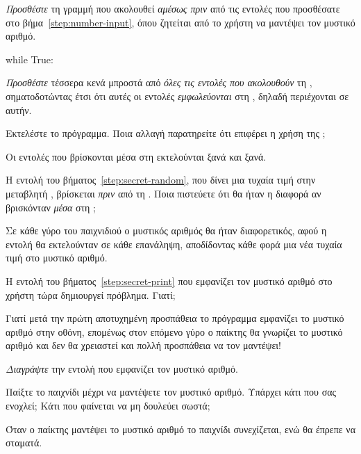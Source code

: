 \documentclass[a4paper,11pt,oneside]{book}
\begin{document}
\begin{step}
\emph{Προσθέστε} τη γραμμή που ακολουθεί \emph{αμέσως πριν} από τις εντολές που προσθέσατε στο βήμα~\ref{step:number-input}, όπου ζητείται από το χρήστη να μαντέψει τον μυστικό αριθμό.

\begin{pynew}
while True:
\end{pynew}

\emph{Προσθέστε} τέσσερα κενά μπροστά από \emph{όλες τις εντολές που ακολουθούν} τη , σηματοδοτώντας έτσι ότι αυτές οι εντολές \emph{εμφωλεύονται} στη , δηλαδή περιέχονται σε αυτήν.

Εκτελέστε το πρόγραμμα. Ποια αλλαγή παρατηρείτε ότι επιφέρει η χρήση της ;

\begin{answer}
	Οι εντολές που βρίσκονται μέσα στη  εκτελούνται ξανά και ξανά.
\end{answer}

Η εντολή του βήματος~\ref{step:secret-random}, που δίνει μια τυχαία τιμή στην μεταβλητή , βρίσκεται \emph{πριν} από τη . Ποια πιστεύετε ότι θα ήταν η διαφορά αν βρισκόνταν \emph{μέσα} στη ;

\begin{answer}
Σε κάθε γύρο του παιχνιδιού ο μυστικός αριθμός θα ήταν διαφορετικός, αφού η εντολή  θα εκτελούνταν σε κάθε επανάληψη, αποδίδοντας κάθε φορά μια νέα τυχαία τιμή στο μυστικό αριθμό.
\end{answer}

\label{step:secret-print-remove}
Η εντολή του βήματος~\ref{step:secret-print} που εμφανίζει τον μυστικό αριθμό στο χρήστη τώρα δημιουργεί πρόβλημα. Γιατί;

\begin{answer}
Γιατί μετά την πρώτη αποτυχημένη προσπάθεια το πρόγραμμα εμφανίζει το μυστικό αριθμό στην οθόνη, επομένως στον επόμενο γύρο ο παίκτης θα γνωρίζει το μυστικό αριθμό και δεν θα χρειαστεί και πολλή προσπάθεια να τον μαντέψει!
\end{answer}

\emph{Διαγράψτε} την εντολή που εμφανίζει τον μυστικό αριθμό.

Παίξτε το παιχνίδι μέχρι να μαντέψετε τον μυστικό αριθμό. Υπάρχει κάτι που σας ενοχλεί; Κάτι που φαίνεται να μη δουλεύει σωστά;

\begin{answer}
	Όταν ο παίκτης μαντέψει το μυστικό αριθμό το παιχνίδι συνεχίζεται, ενώ θα έπρεπε να σταματά.
\end{answer}
\end{step}
\end{document}

